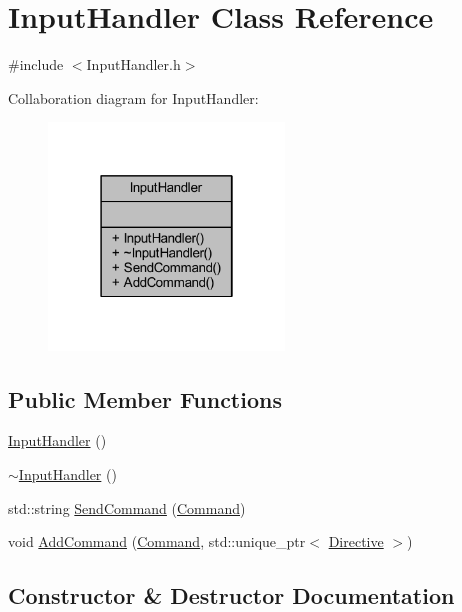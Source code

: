 \hypertarget{class_input_handler}{}\section{Input\+Handler Class Reference}
\label{class_input_handler}


{\ttfamily \#include $<$Input\+Handler.\+h$>$}



Collaboration diagram for Input\+Handler\+:
\nopagebreak
\begin{figure}[H]
\begin{center}
\leavevmode
\includegraphics[width=178pt]{class_input_handler__coll__graph}
\end{center}
\end{figure}
\subsection*{Public Member Functions}
\begin{DoxyCompactItemize}
\item 
\mbox{\hyperlink{class_input_handler_a698aa4af4f326a9881835fda251ca996}{Input\+Handler}} ()
\item 
\mbox{\hyperlink{class_input_handler_ac1f7efb54b34d433d6ffba62627452b6}{$\sim$\+Input\+Handler}} ()
\item 
std\+::string \mbox{\hyperlink{class_input_handler_a56716403455708430c7c5e65e44cb118}{Send\+Command}} (\mbox{\hyperlink{_commands_8h_a16664d91c016c57e51eff6cbd28e32cf}{Command}})
\item 
void \mbox{\hyperlink{class_input_handler_ada312ad1f3af7ee1742f11d353185961}{Add\+Command}} (\mbox{\hyperlink{_commands_8h_a16664d91c016c57e51eff6cbd28e32cf}{Command}}, std\+::unique\+\_\+ptr$<$ \mbox{\hyperlink{class_directive}{Directive}} $>$)
\end{DoxyCompactItemize}


\subsection{Constructor \& Destructor Documentation}
\mbox{\label{class_input_handler_a698aa4af4f326a9881835fda251ca996}} 
